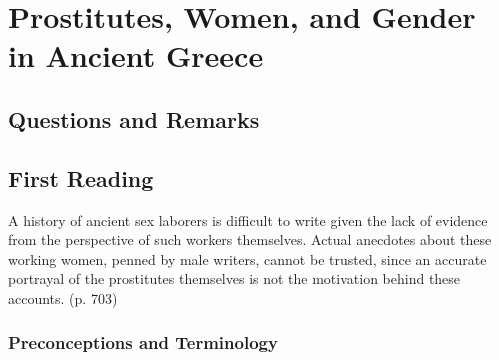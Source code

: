 %
%
%
\chapter{Prostitutes, Women, and Gender in Ancient Greece}
\label{chap:ProstWomGen} %








\abstract{}

\section{Questions and Remarks}
\label{sec:QR17}




\section{First Reading}
\label{sec:FirRead17}


A history of ancient sex laborers is difficult to write given the lack of evidence from the perspective of such workers themselves. Actual anecdotes about these working women, penned by male writers, cannot be trusted, since an accurate portrayal of the prostitutes themselves is not the motivation behind these accounts. (p. 703)


\subsection{Preconceptions and Terminology}


